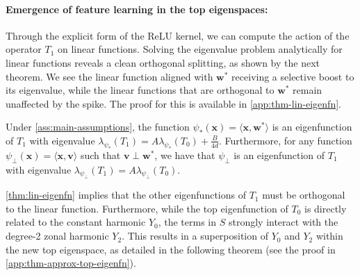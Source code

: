 \paragraph{Emergence of feature learning in the top eigenspaces:} Through the explicit form of the ReLU kernel, we can compute the action of the operator $T_1$ on linear functions. Solving the eigenvalue problem analytically for linear functions reveals a clean orthogonal splitting, as shown by the next theorem. We see the linear function aligned with $\bm w^*$ receiving a selective boost to its eigenvalue, while the linear functions that are orthogonal to $\bm w^*$ remain unaffected by the spike. The proof for this is available in \cref{app:thm-lin-eigenfn}.
\begin{theorem}\label{thm:lin-eigenfn}
    Under \cref{ass:main-assumptions}, the function $\psi_{*}(\bm x) = \langle \bm x, \bm w^*\rangle$ is an eigenfunction of $T_1$ with eigenvalue $\lambda_{\psi_*}(T_1) = A\lambda_{\psi_*}(T_0) + \frac{B}{4d}$. Furthermore, for any function $\psi_{\perp}(\bm x) = \langle \bm x, \bm v\rangle$ such that $\bm v \perp \bm w^*$, we have that $\psi_{\perp}$ is an eigenfunction of $T_1$ with eigenvalue $\lambda_{\psi_\perp}(T_1) = A \lambda_{\psi_\perp}(T_0)$.
\end{theorem}

\cref{thm:lin-eigenfn} implies that the other eigenfunctions of $T_1$ must be orthogonal to the linear function. Furthermore, while the top eigenfunction of $T_0$ is directly related to the constant harmonic $Y_0$, the terms in $S$ strongly interact with the degree-2 zonal harmonic $Y_2$. This results in a superposition of $Y_0$ and $Y_2$ within the new top eigenspace, as detailed in the following theorem (see the proof in \cref{app:thm-approx-top-eigenfn}). %

